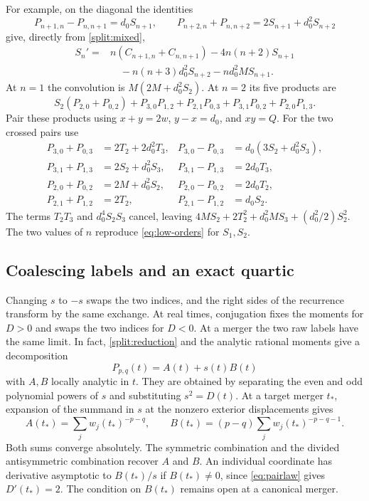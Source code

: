 For example, on the diagonal the identities
\[
 P_{n+1,n}-P_{n,n+1}=d_0 S_{n+1},\qquad
 P_{n+2,n}+P_{n,n+2}=2S_{n+1}+d_0^2S_{n+2}
\]
give, directly from \eqref{split:mixed},
\begin{align*}
 S_n'={}&n(C_{n+1,n}+C_{n,n+1})-4n(n+2)S_{n+1}\\
        &\quad-n(n+3)d_0^2S_{n+2}-nd_0^2MS_{n+1}.
\end{align*}
At \(n=1\) the convolution is \(M(2M+d_0^2 S_2)\).
At \(n=2\) its five products are
\[
 S_2(P_{2,0}+P_{0,2})+P_{3,0}P_{1,2}+P_{2,1}P_{0,3}
                       +P_{3,1}P_{0,2}+P_{2,0}P_{1,3}.
\]
Pair these products using \(x+y=2w\), \(y-x=d_0\), and \(xy=Q\).
For the two crossed pairs use
\begin{align*}
 P_{3,0}+P_{0,3}&=2T_2+2d_0^2T_3,&
 P_{3,0}-P_{0,3}&=d_0(3S_2+d_0^2S_3),\\
 P_{3,1}+P_{1,3}&=2S_2+d_0^2S_3,&
 P_{3,1}-P_{1,3}&=2d_0 T_3,\\
 P_{2,0}+P_{0,2}&=2M+d_0^2 S_2,&
 P_{2,0}-P_{0,2}&=2d_0 T_2,\\
 P_{2,1}+P_{1,2}&=2T_2,&
 P_{2,1}-P_{1,2}&=d_0 S_2 .
\end{align*}
The terms \(T_2T_3\) and \(d_0^4S_2S_3\) cancel, leaving
\(4MS_2+2T_2^2+d_0^2MS_3+(d_0^2/2)S_2^2\).
The two values of \(n\) reproduce \eqref{eq:low-orders} for \(S_1,S_2\).

\subsection{Coalescing labels and an exact quartic}

Changing \(s\) to \(-s\) swaps the two indices, and the right
sides of the recurrence transform by the same exchange. At real
times, conjugation fixes the moments for \(D>0\) and swaps the
two indices for \(D<0\). At a merger the two raw labels have the
same limit. In fact, \eqref{split:reduction} and the analytic
rational moments give a decomposition
\[
 P_{p,q}(t)=A(t)+s(t)B(t)
\]
with \(A,B\) locally analytic in \(t\). They are obtained by
separating the even and odd polynomial powers of \(s\) and
substituting \(s^2=D(t)\). At a target merger \(t_*\), expansion of
the summand in \(s\) at the nonzero exterior displacements gives
\[
 A(t_*)=\sum_j w_j(t_*)^{-p-q},\qquad
 B(t_*)=(p-q)\sum_j w_j(t_*)^{-p-q-1}.
\]
Both sums converge absolutely. The symmetric combination and
the divided antisymmetric combination recover \(A\) and \(B\).
An individual coordinate has derivative asymptotic to \(B(t_*)/s\)
if \(B(t_*)\ne0\), since \eqref{eq:pairlaw} gives \(D'(t_*)=2\).
The condition on \(B(t_*)\) remains open at a canonical merger.

